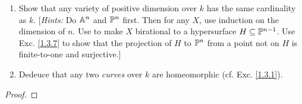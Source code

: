 \label{1.4.8}

\begin{enumerate}[label = (\alph*)]
    \item Show that any variety of positive dimension over $k$ has the same cardinality as $k$. [\emph{Hints:} Do $\A^n$ and $\P^n$ first. Then for any $X$, use induction on the dimension of $n$. Use \cite[I.4.9]{hartshorne} to make $X$ birational to a hypersurface $H \subseteq \P^{n - 1}$. Use Exc. \ref{1.3.7} to show that the projection of $H$ to $\P^n$ from a point not on $H$ is finite-to-one and surjective.]

    \item Dedeuce that any two \emph{curves} over $k$ are homeomorphic (cf. Exc. \ref{1.3.1}).
\end{enumerate}

\begin{proof}

\end{proof}
